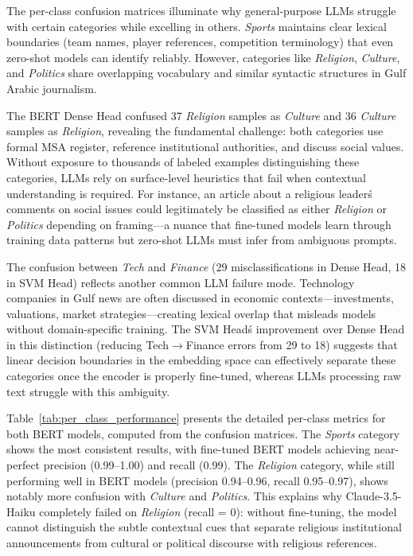 \documentclass[preprint,12pt,authoryear]{elsarticle}
\begin{document}
The per-class confusion matrices illuminate why general-purpose LLMs struggle with certain categories while excelling in others. \textit{Sports} maintains clear lexical boundaries (team names, player references, competition terminology) that even zero-shot models can identify reliably. However, categories like \textit{Religion}, \textit{Culture}, and \textit{Politics} share overlapping vocabulary and similar syntactic structures in Gulf Arabic journalism.

The BERT Dense Head confused 37 \textit{Religion} samples as \textit{Culture} and 36 \textit{Culture} samples as \textit{Religion}, revealing the fundamental challenge: both categories use formal MSA register, reference institutional authorities, and discuss social values. Without exposure to thousands of labeled examples distinguishing these categories, LLMs rely on surface-level heuristics that fail when contextual understanding is required. For instance, an article about a religious leader\'s comments on social issues could legitimately be classified as either \textit{Religion} or \textit{Politics} depending on framing---a nuance that fine-tuned models learn through training data patterns but zero-shot LLMs must infer from ambiguous prompts.

The confusion between \textit{Tech} and \textit{Finance} (29 misclassifications in Dense Head, 18 in SVM Head) reflects another common LLM failure mode. Technology companies in Gulf news are often discussed in economic contexts---investments, valuations, market strategies---creating lexical overlap that misleads models without domain-specific training. The SVM Head\'s improvement over Dense Head in this distinction (reducing Tech$\rightarrow$Finance errors from 29 to 18) suggests that linear decision boundaries in the embedding space can effectively separate these categories once the encoder is properly fine-tuned, whereas LLMs processing raw text struggle with this ambiguity.

Table~\ref{tab:per_class_performance} presents the detailed per-class metrics for both BERT models, computed from the confusion matrices. The \textit{Sports} category shows the most consistent results, with fine-tuned BERT models achieving near-perfect precision (0.99--1.00) and recall (0.99). The \textit{Religion} category, while still performing well in BERT models (precision 0.94--0.96, recall 0.95--0.97), shows notably more confusion with \textit{Culture} and \textit{Politics}. This explains why Claude-3.5-Haiku completely failed on \textit{Religion} (recall = 0): without fine-tuning, the model cannot distinguish the subtle contextual cues that separate religious institutional announcements from cultural or political discourse with religious references.
\end{document}
